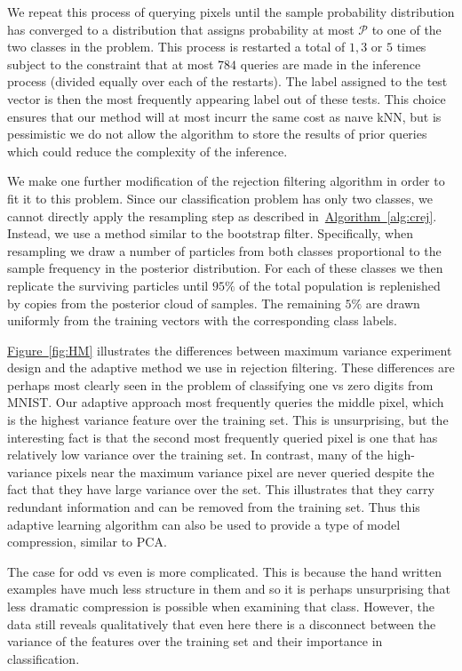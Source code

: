 \documentclass[twoside]{article}
\newcommand{\fig}[1]{\hyperref[fig:#1]{Figure~\ref*{fig:#1}}}
\newcommand{\alg}[1]{\hyperref[alg:#1]{Algorithm~\ref*{alg:#1}}}
\begin{document}
We repeat this process of querying pixels until the sample probability distribution has converged to a distribution that
assigns probability at most $\mathcal{P}$ to one of the two classes in the problem.  This process is restarted a total of
$1,3$ or $5$ times subject to the constraint that at most $784$ queries are made in the inference process (divided equally over each of the restarts).
The label assigned to the test vector is then the most frequently appearing label out of these tests.  This choice ensures that our method will at most
incurr the same cost as na\i ve kNN, but is pessimistic we do not allow the algorithm to store the results of prior queries which could reduce the 
complexity of the inference.

We make one further modification of the rejection filtering algorithm in order to fit it to this problem.  Since our classification problem has only two classes, we cannot directly apply the resampling step as described in~\alg{crej}.  Instead, we use a method similar to the bootstrap filter.  Specifically, when resampling we draw a number of particles from both
classes proportional to the sample frequency in the posterior distribution.  For each of these classes we then replicate the surviving particles until $95\%$ of the total population is replenished
by copies from the posterior cloud of samples.  The remaining $5\%$ are drawn uniformly from the training vectors with the corresponding class labels.

\fig{HM} illustrates the differences between maximum variance experiment design and the adaptive method we use in rejection filtering.  These differences
are perhaps most clearly seen in the problem of classifying one vs zero digits from MNIST.  Our adaptive approach most frequently queries the middle pixel, which is the 
highest variance feature over the training set.  This is unsurprising, but the interesting fact is that the second most frequently queried pixel is one that has relatively low variance
over the training set.  In contrast, many of the high-variance pixels near the maximum variance pixel are never queried despite the fact that they have large variance over the set.
This illustrates that they carry redundant information and can be removed from the training set.  Thus this adaptive learning algorithm can also be used to provide a type of model compression, similar to PCA.

The case for odd vs even is more complicated.  This is because the hand written examples have much less structure in them and so it is perhaps unsurprising that less dramatic compression is possible when examining that class. However, the data still reveals qualitatively that even here there is a disconnect between the variance of the features over the training set and their importance in classification.
\end{document}
